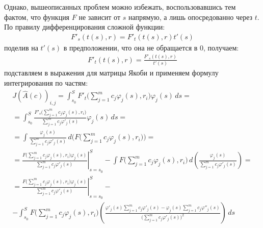 \documentclass[a4paper,14pt]{extarticle}
\begin{document}
    Однако,  вышеописанных проблем можно избежать, воспользовавшись тем фактом, что функция $F$ не зависит от $s$ напрямую, а лишь опосредованно через $t$. По правилу дифференцирования сложной функции:
    \begin{gather*}
        F'_s(t(s), r) = F'_t(t(s), r) t'(s)
    \end{gather*}
    поделив на $t'(s)$ в предположении, что она не обращается в 0, получаем:
    \begin{gather*}
        F'_t(t(s), r) = \frac{F'_s(t(s), r)}{t'(s)}
    \end{gather*}
    подставляем в выражения для матрицы Якоби и применяем формулу интегрирования по частям:
    \begin{gather*}
        J(\hat{A}(c))_{i, j}
        = \int_{s_0}^{S}
        F'_t
        \Big(
        \sum_{j = 1}^m c_j \varphi_j(s)
        , r_i
        \Big)
        \varphi_j(s)
        \, ds = \\
        = \int_{s_0}^{S}
        \frac{
            F'_s
            \big(
            \sum_{j = 1}^m c_j \varphi_j(s)
            , r_i
            \big)
        }{
            \sum_{j = 1}^m c_j \varphi'_j(s)
        }
        \varphi_j(s)
        \, ds = \\
        = \int
        \frac{
            \varphi_j(s)
        }{
            \sum_{j = 1}^m c_j \varphi'_j(s)
        }
        \, d \bigg(
        F
        \Big(
        \sum_{j = 1}^m c_j \varphi_j(s)
        , r_i
        \Big)
        \bigg) = \\
        = \left.
        \frac{
            F
            \big(
            \sum_{j = 1}^m c_j \varphi_j(s)
            , r_i
            \big)
            \varphi_j(s)
        }{
            \sum_{j = 1}^m c_j \varphi'_j(s)
        }
        \right|_{s = s_0}^S
        -
        \int
        F
        \Big(
        \sum_{j = 1}^m c_j \varphi_j(s)
        , r_i
        \Big)
        \, d\left(
        \frac{
            \varphi_j(s)
        }{
            \sum_{j = 1}^m c_j \varphi'_j(s)
        }
        \right)
        = \\ = \left.
        \frac{
            F
            \big(
            \sum_{j = 1}^m c_j \varphi_j(s)
            , r_i
            \big)
            \varphi_j(s)
        }{
            \sum_{j = 1}^m c_j \varphi'_j(s)
        }
        \right|_{s = s_0}^S
        - \\ -
        \int_{s_0}^{S}
        F
        \Big(
        \sum_{j = 1}^m c_j \varphi_j(s)
        , r_i
        \Big)
        \left(
        \frac{
            \varphi'_j(s)
            \sum_{j = 1}^m c_j \varphi'_j(s)
            -
            \varphi_j(s)
            \sum_{j = 1}^m c_j \varphi''_j(s)
        }{
            \big(
            \sum_{j = 1}^m c_j \varphi'_j(s)
            \big)^2
        }
        \right)
        \, ds
    \end{gather*}
\end{document}
